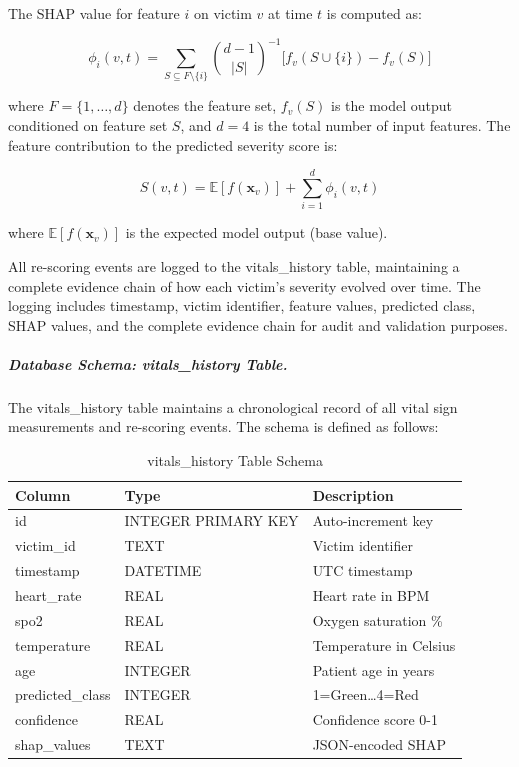 \documentclass[conference]{IEEEtran}
\begin{document}
The SHAP value for feature $i$ on victim $v$ at time $t$ is computed as:

\begin{equation}
\phi_i(v, t) = 
\sum_{S \subseteq F \setminus \{i\}} 
\binom{d-1}{|S|}^{-1}
\bigl[ f_v(S \cup \{i\}) - f_v(S) \bigr]
\end{equation}

where $F = \{1,\dots,d\}$ denotes the feature set, $f_v(S)$ is the model output conditioned on feature set $S$, and $d = 4$ is the total number of input features. The feature contribution to the predicted severity score is:

\begin{equation}
S(v,t) = \mathbb{E}[f(\mathbf{x}_v)] + \sum_{i=1}^{d} \phi_i(v, t)
\end{equation}

where $\mathbb{E}[f(\mathbf{x}_v)]$ is the expected model output (base value).

All re-scoring events are logged to the vitals\_history table, maintaining a complete evidence chain of how each victim's severity evolved over time. The logging includes timestamp, victim identifier, feature values, predicted class, SHAP values, and the complete evidence chain for audit and validation purposes.

\subparagraph{Database Schema: vitals\_history Table.}
The vitals\_history table maintains a chronological record of all vital sign measurements and re-scoring events. The schema is defined as follows:

\begin{table}[t]
\caption{vitals\_history Table Schema}
\label{tab:vitals_schema}
\centering
\begin{tabularx}{\linewidth}{|l|X|X|}
\hline
\textbf{Column} & \textbf{Type} & \textbf{Description} \\
\hline
id & INTEGER PRIMARY KEY & Auto-increment key \\
victim\_id & TEXT & Victim identifier \\
timestamp & DATETIME & UTC timestamp \\
heart\_rate & REAL & Heart rate in BPM \\
spo2 & REAL & Oxygen saturation \% \\
temperature & REAL & Temperature in Celsius \\
age & INTEGER & Patient age in years \\
predicted\_class & INTEGER & 1=Green\ldots4=Red \\
confidence & REAL & Confidence score 0-1 \\
shap\_values & TEXT & JSON-encoded SHAP \\
\hline
\end{tabularx}
\end{table}
\end{document}
